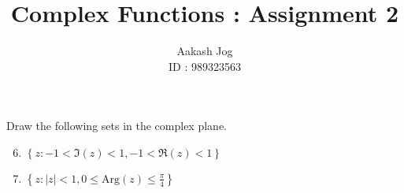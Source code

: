 \documentclass[fleqn, a4paper, 11pt, oneside]{amsart}
\title{Complex Functions : Assignment 2}
\author
{
	Aakash Jog\\
	ID : 989323563
}
\date{\formatdate{11}{11}{2015}}
\theoremstyle{definition}
\theoremstyle{theorem}
\newcommand{\Arg}{\mathrm{Arg}}
\begin{document}

\maketitle

\setcounter{question}{0}
\begin{question}
	Draw the following sets in the complex plane.
	\begin{enumerate}[label=({\alph*})]
		\setcounter{enumi}{5}
		\item $\left\{ z : -1 < \Im(z) < 1 , -1 < \Re(z) < 1 \right\}$
		\setcounter{enumi}{7}
		\item $\left\{ z : |z| < 1 , 0 \le \Arg(z) \le \frac{\pi}{4} \right\}$
	\end{enumerate}
\end{question}
\end{document}
